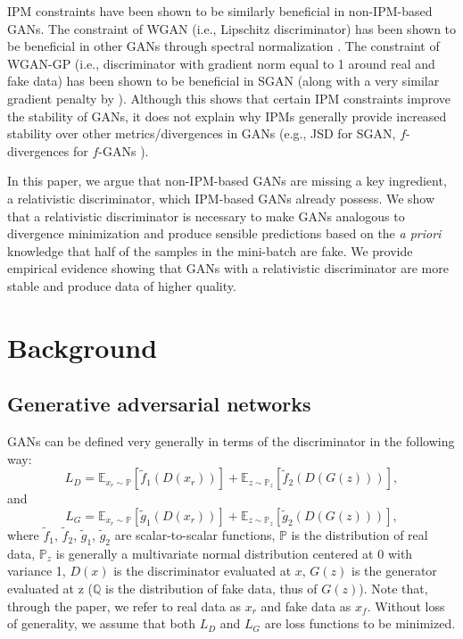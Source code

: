 \documentclass{article}
\begin{document}
IPM constraints have been shown to be similarly beneficial in non-IPM-based GANs. The constraint of WGAN (i.e., Lipschitz discriminator) has been shown to be beneficial in other GANs through spectral normalization \citep{miyato2018spectral}. The constraint of WGAN-GP (i.e., discriminator with gradient norm equal to 1 around real and fake data) has been shown to be beneficial in SGAN \citep{ManyPaths} (along with a very similar gradient penalty by \cite{DRAGAN}). Although this shows that certain IPM constraints improve the stability of GANs, it does not explain why IPMs generally provide increased stability over other metrics/divergences in GANs (e.g., JSD for SGAN, $f$-divergences for $f$-GANs \citep{F-GAN}).

In this paper, we argue that non-IPM-based GANs are missing a key ingredient, a relativistic discriminator, which IPM-based GANs already possess. We show that a relativistic discriminator is necessary to make GANs analogous to divergence minimization and produce sensible predictions based on the \textit{a priori} knowledge that half of the samples in the mini-batch are fake. We provide empirical evidence showing that GANs with a relativistic discriminator are more stable and produce data of higher quality.

\section{Background}

\subsection{Generative adversarial networks}

GANs can be defined very generally in terms of the discriminator in the following way:
\begin{equation}
L_D = \mathbb{E}_{x_r \sim \mathbb{P}}\left[ \tilde{f}_1(D(x_r)) \right] + \mathbb{E}_{z \sim \mathbb{P}_z} \left[ \tilde{f}_2(D(G(z))) \right],
\end{equation}
and
\begin{equation}
L_G = \mathbb{E}_{x_r \sim \mathbb{P}}\left[ \tilde{g}_1(D(x_r)) \right] + \mathbb{E}_{z \sim \mathbb{P}_z} \left[ \tilde{g}_2(D(G(z))) \right],
\end{equation}
where $\tilde{f}_1$, $\tilde{f}_2$, $\tilde{g}_1$, $\tilde{g}_2$ are scalar-to-scalar functions, $\mathbb{P}$ is the distribution of real data,  $\mathbb{P}_z$ is generally a multivariate normal distribution centered at $0$ with variance 1, $D(x)$ is the discriminator evaluated at $x$, $G(z)$ is the generator evaluated at z ($\mathbb{Q}$ is the distribution of fake data, thus of $G(z)$). Note that, through the paper, we refer to real data as $x_r$ and fake data as $x_f$. Without loss of generality, we assume that both $L_D$ and $L_G$ are loss functions to be minimized.
\end{document}
